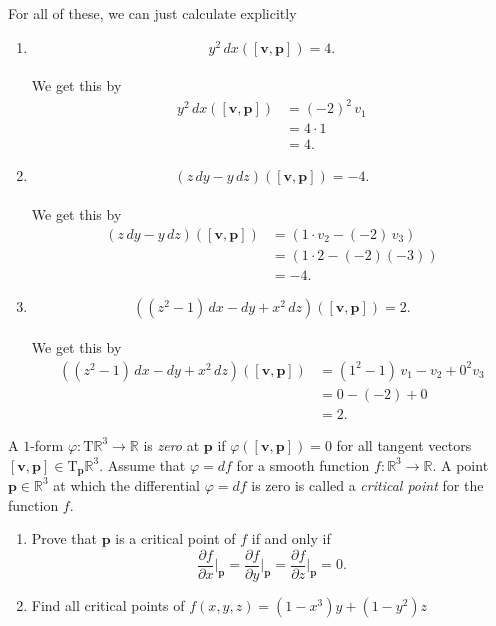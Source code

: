 \documentclass[12 pt, letterpaper]{hmcpset}
\begin{document}
\begin{solution}
	For all of these, we can just calculate explicitly
	\begin{enumerate}
		\item 
			\[
				\boxed{
					y^2 \, dx ([\mathbf v, \mathbf p]) = 4.
				}
			\]\\
			We get this by
			\[
				\begin{split}
					y^2 \, dx([\mathbf v, \mathbf p]) & = (-2)^2 \, v_1 \\
									  & = 4 \cdot 1 \\
									  & = 4.
				\end{split}
			\]
		\item
			\[
				\boxed{
					(z \, dy - y \, dz)([\mathbf v, \mathbf p]) = -4.
				}
			\]\\
			We get this by
			\[
				\begin{split}
					(z \, dy - y \, dz)([\mathbf v, \mathbf p]) & = (1 \cdot v_2 - (-2) \, v_3) \\
										    & = (1 \cdot 2 - (-2)(-3)) \\
										    & = -4.
				\end{split}
			\]
		\item
			\[
				\boxed{
					((z^2 - 1) \, dx - dy + x^2 \, dz)([\mathbf v, \mathbf p]) = 2.
				}
			\]\\
			We get this by
			\[
				\begin{split}
					((z^2 - 1) \, dx - dy + x^2 \, dz)([\mathbf v, \mathbf p]) & = (1^2 - 1) \, v_1 - v_2 + 0^2 v_3 \\
												   & = 0 - (-2) + 0 \\
												   & = 2.
				\end{split}
			\]
	\end{enumerate}
\end{solution}

\pagebreak

\begin{problem}[Problem 3]
	A $1$-form $\varphi : \mathrm T \mathbb R^3 \to \mathbb R$ is \textit{zero} at $\mathbf p$ if $\varphi([\mathbf v, \mathbf p]) = 0$ for all tangent vectors $[\mathbf v, \mathbf p] \in \mathrm T_{\mathbf p} \mathbb R^3$. Assume that $\varphi = df$ for a smooth function $f : \mathbb R^3 \to \mathbb R$. A point $\mathbf p \in \mathbb R^3$ at which the differential $\varphi = df$ is zero is called a \textit{critical point} for the function $f$.
	\begin{enumerate}
		\item Prove that $\mathbf p$ is a critical point of $f$ if and only if 
			\[
				\frac{\partial f}{\partial x} \Big |_{\mathbf p} = \frac{\partial f}{\partial y} \Big |_{\mathbf p} = \frac{\partial f}{\partial z} \Big |_{\mathbf p} = 0.
			\]
		\item Find all critical points of $f(x, y, z) = (1 - x^3) y + (1 - y^2) z$
	\end{enumerate}
\end{problem}
\end{document}
